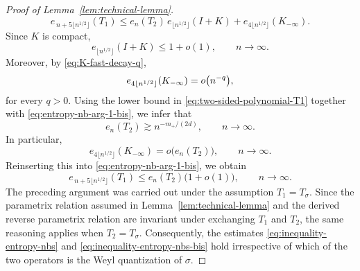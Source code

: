 \documentclass[a4paper,12pt]{article}
\let\originalleft\left
\let\originalright\right
\renewcommand{\left}{\mathopen{}\mathclose\bgroup\originalleft}
\renewcommand{\right}{\aftergroup\egroup\originalright}
\newcommand{\N}{\mathbb{N}}
\begin{document}
\begin{proof}[Proof of Lemma~\ref{lem:technical-lemma}]
\begin{equation}
    e_{\,n+5\lfloor n^{1/2}\rfloor}(T_1)
    \le
    e_n(T_2)\,e_{\lfloor n^{1/2}\rfloor}(I+K)
    +
    e_{4\lfloor n^{1/2}\rfloor}(K_{-\infty}).
\end{equation}
Since \(K\) is compact,
\[
e_{\lfloor n^{1/2}\rfloor}(I+K)\le 1+o(1),
\qquad n\to\infty.
\]
Moreover, by \eqref{eq:K-fast-decay-q},
\[
e_{4\lfloor n^{1/2}\rfloor}(K_{-\infty})
=
o \left(n^{-q}\right),
\]
for every $q>0$.
Using the lower bound in \eqref{eq:two-sided-polynomial-T1} together with
\eqref{eq:entropy-nb-arg-1-bis}, we infer that
\[
e_n(T_2)\gtrsim n^{-m_+/(2d)},
\qquad n\to\infty.
\]
In particular,
\[
e_{4\lfloor n^{1/2}\rfloor}(K_{-\infty})
=
o \bigl(e_n(T_2)\bigr),
\qquad n\to\infty.
\]
Reinserting this into \eqref{eq:entropy-nb-arg-1-bis}, we obtain
\begin{equation}\label{eq:inequality-entropy-nbs-bis}
    e_{\,n+5\lfloor n^{1/2}\rfloor}(T_1)
    \le
    e_n(T_2)\bigl(1+o(1)\bigr),
    \qquad n\to\infty.
\end{equation}
The preceding argument was carried out under the assumption \(T_1=T_\sigma\).
Since the parametrix relation assumed in Lemma~\ref{lem:technical-lemma} and the
derived reverse parametrix relation are invariant under exchanging \(T_1\) and
\(T_2\), the same reasoning applies when \(T_2=T_\sigma\).
Consequently, the estimates
\eqref{eq:inequality-entropy-nbs} and
\eqref{eq:inequality-entropy-nbs-bis}
hold irrespective of which of the two operators is the Weyl quantization of
\(\sigma\).

\end{proof}
\end{document}
